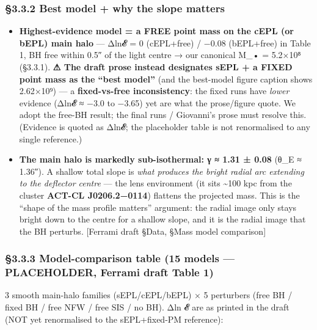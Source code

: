 \documentclass[
]{article}
\providecommand{\tightlist}{%
  \setlength{\itemsep}{0pt}\setlength{\parskip}{0pt}}
\begin{document}
\hypertarget{best-model-why-the-slope-matters}{%
\subsubsection{§3.3.2 Best model + why the slope
matters}\label{best-model-why-the-slope-matters}}

\begin{itemize}
\tightlist
\item
  \textbf{Highest-evidence model = a FREE point mass on the cEPL (or
  bEPL) main halo} --- Δln𝓔 = 0 (cEPL+free) / −0.08 (bEPL+free) in Table
  1, BH free within 0.5″ of the light centre → our canonical M\_• =
  5.2×10⁸ (§3.3.1). \textbf{⚠ The draft prose instead designates sEPL +
  a FIXED point mass as the ``best model''} (and the best-model figure
  caption shows 2.62×10⁹) --- a \textbf{fixed-vs-free inconsistency}:
  the fixed runs have \emph{lower} evidence (Δln𝓔 ≈ −3.0 to −3.65) yet
  are what the prose/figure quote. We adopt the free-BH result; the
  final runs / Giovanni's prose must resolve this. (Evidence is quoted
  as Δln𝓔; the placeholder table is not renormalised to any single
  reference.)
\item
  \textbf{The main halo is markedly sub-isothermal: γ ≈ 1.31 ± 0.08}
  (θ\_E ≈ 1.36″). A shallow total slope is \emph{what produces the
  bright radial arc extending to the deflector centre} --- the lens
  environment (it sits \textasciitilde100 kpc from the cluster
  \textbf{ACT-CL J0206.2−0114}) flattens the projected mass. This is the
  ``shape of the mass profile matters'' argument: the radial image only
  stays bright down to the centre for a shallow slope, and it is the
  radial image that the BH perturbs. {[}Ferrami draft §Data, §Mass model
  comparison{]}
\end{itemize}

\hypertarget{model-comparison-table-15-models-placeholder-ferrami-draft-table-1}{%
\subsubsection{§3.3.3 Model-comparison table (15 models --- PLACEHOLDER,
Ferrami draft Table
1)}\label{model-comparison-table-15-models-placeholder-ferrami-draft-table-1}}

3 smooth main-halo families (sEPL/cEPL/bEPL) × 5 perturbers (free BH /
fixed BH / free NFW / free SIS / no BH). Δln 𝓔 are as printed in the
draft (NOT yet renormalised to the sEPL+fixed-PM reference):
\end{document}
